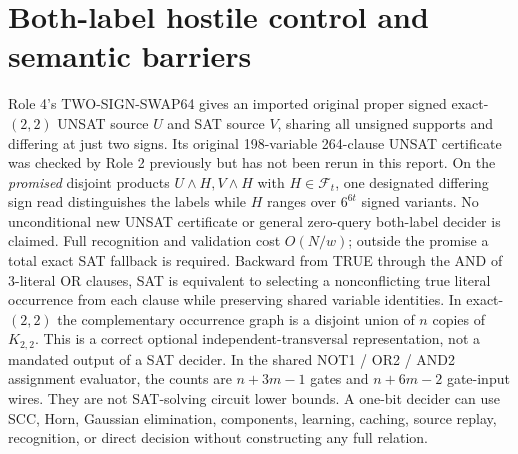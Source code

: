 \documentclass[11pt]{article}
\begin{document}
\section{Both-label hostile control and semantic barriers}
Role 4's TWO-SIGN-SWAP64 gives an imported original proper signed exact-$(2,2)$ UNSAT source $U$ and SAT source $V$, sharing all unsigned supports and differing at just two signs. Its original 198-variable 264-clause UNSAT certificate was checked by Role 2 previously but has not been rerun in this report. On the \emph{promised} disjoint products $U\wedge H,V\wedge H$ with $H\in\mathcal F_t$, one designated differing sign read distinguishes the labels while $H$ ranges over $6^{6t}$ signed variants. No unconditional new UNSAT certificate or general zero-query both-label decider is claimed. Full recognition and validation cost $O(N/w)$; outside the promise a total exact SAT fallback is required.
Backward from TRUE through the AND of 3-literal OR clauses, SAT is equivalent to selecting a nonconflicting true literal occurrence from each clause while preserving shared variable identities. In exact-$(2,2)$ the complementary occurrence graph is a disjoint union of $n$ copies of $K_{2,2}$. This is a correct optional independent-transversal representation, not a mandated output of a SAT decider. In the shared NOT1 / OR2 / AND2 assignment evaluator, the counts are $n+3m-1$ gates and $n+6m-2$ gate-input wires. They are not SAT-solving circuit lower bounds. A one-bit decider can use SCC, Horn, Gaussian elimination, components, learning, caching, source replay, recognition, or direct decision without constructing any full relation.
\end{document}
